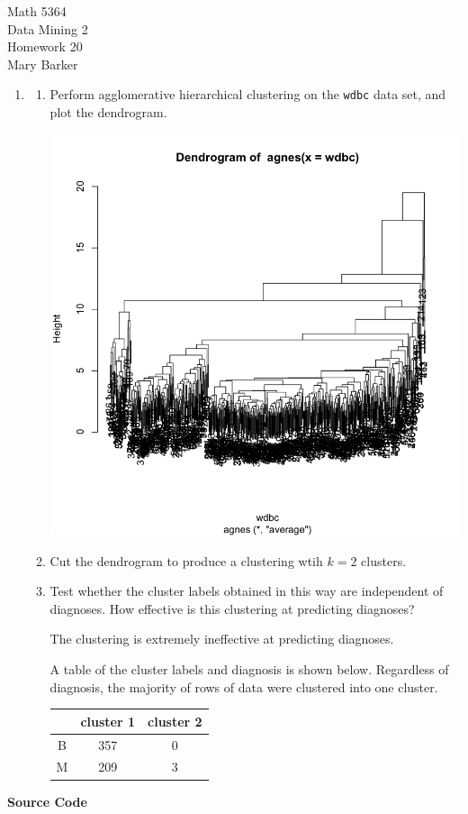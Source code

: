 \documentclass[11pt]{article}
\begin{document}
\noindent\large{Math 5364}\\
\large{Data Mining 2}\\
\large{Homework 20}\\
\large{Mary Barker}
\doublespace
\begin{enumerate}
\item 
\begin{enumerate}
\item Perform agglomerative hierarchical clustering on the \verb|wdbc| data set, and plot the dendrogram. 

\begin{center}
\includegraphics[scale=0.125]{dendrogram}
\end{center}

\item Cut the dendrogram to produce a clustering wtih $k = 2$ clusters.

\item Test whether the cluster labels obtained in this way are independent of diagnoses. How effective is this clustering at predicting diagnoses? 

The clustering is extremely ineffective at predicting diagnoses. 

A table of the cluster labels and diagnosis is shown below. Regardless of diagnosis, the majority of rows of data were clustered into one cluster. 

\begin{center}
\begin{tabular}{| c | c | c |}
\hline
      & cluster 1 & cluster   2 \\ \hline
   B & 357 &   0 \\ \hline
   M & 209 &   3 \\ \hline
\end{tabular}
\end{center}

\end{enumerate}

\end{enumerate}

\pagebreak
\begin{center}
\textbf{Source Code}
\end{center}

\end{document}
